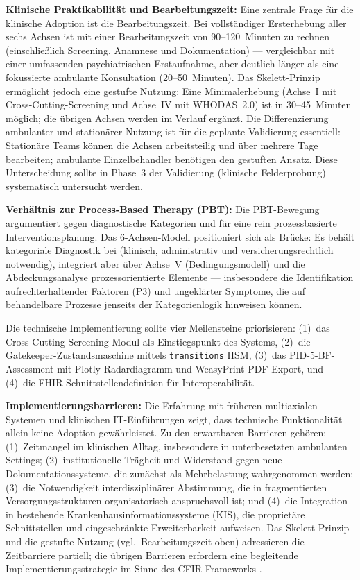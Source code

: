\documentclass[11pt,a4paper]{article}
\begin{document}
\textbf{Klinische Praktikabilit\"at und Bearbeitungszeit:} Eine zentrale Frage f\"ur die klinische Adoption ist die Bearbeitungszeit. Bei vollst\"andiger Ersterhebung aller sechs Achsen ist mit einer Bearbeitungszeit von 90--120~Minuten zu rechnen (einschlie\ss{}lich Screening, Anamnese und Dokumentation) --- vergleichbar mit einer umfassenden psychiatrischen Erstaufnahme, aber deutlich l\"anger als eine fokussierte ambulante Konsultation (20--50~Minuten). Das Skelett-Prinzip erm\"oglicht jedoch eine gestufte Nutzung: Eine Minimalerhebung (Achse~I mit Cross-Cutting-Screening und Achse~IV mit WHODAS~2.0) ist in 30--45~Minuten m\"oglich; die \"ubrigen Achsen werden im Verlauf erg\"anzt. Die Differenzierung ambulanter und station\"arer Nutzung ist f\"ur die geplante Validierung essentiell: Station\"are Teams k\"onnen die Achsen arbeitsteilig und \"uber mehrere Tage bearbeiten; ambulante Einzelbehandler ben\"otigen den gestuften Ansatz. Diese Unterscheidung sollte in Phase~3 der Validierung (klinische Felderprobung) systematisch untersucht werden.

\textbf{Verh\"altnis zur Process-Based Therapy (PBT):} Die PBT-Bewegung argumentiert gegen diagnostische Kategorien und f\"ur eine rein prozessbasierte Interventionsplanung. Das 6-Achsen-Modell positioniert sich als Br\"ucke: Es beh\"alt kategoriale Diagnostik bei (klinisch, administrativ und versicherungsrechtlich notwendig), integriert aber \"uber Achse~V (Bedingungsmodell) und die Abdeckungsanalyse prozessorientierte Elemente --- insbesondere die Identifikation aufrechterhaltender Faktoren (P3) und ungekl\"arter Symptome, die auf behandelbare Prozesse jenseits der Kategorienlogik hinweisen k\"onnen.

Die technische Implementierung sollte vier Meilensteine priorisieren: (1)~das Cross-Cutting-Screening-Modul als Einstiegspunkt des Systems, (2)~die Gatekeeper-Zustandsmaschine mittels \texttt{transitions} HSM, (3)~das PID-5-BF-Assessment mit Plotly-Radardiagramm und WeasyPrint-PDF-Export, und (4)~die FHIR-Schnittstellendefinition f\"ur Interoperabilit\"at.

\textbf{Implementierungsbarrieren:} Die Erfahrung mit fr\"uheren multiaxialen Systemen und klinischen IT-Einf\"uhrungen zeigt, dass technische Funktionalit\"at allein keine Adoption gew\"ahrleistet. Zu den erwartbaren Barrieren geh\"oren: (1)~Zeitmangel im klinischen Alltag, insbesondere in unterbesetzten ambulanten Settings; (2)~institutionelle Tr\"agheit und Widerstand gegen neue Dokumentationssysteme, die zun\"achst als Mehrbelastung wahrgenommen werden; (3)~die Notwendigkeit interdisziplin\"arer Abstimmung, die in fragmentierten Versorgungsstrukturen organisatorisch anspruchsvoll ist; und (4)~die Integration in bestehende Krankenhausinformationssysteme (KIS), die propriet\"are Schnittstellen und eingeschr\"ankte Erweiterbarkeit aufweisen. Das Skelett-Prinzip und die gestufte Nutzung (vgl.\ Bearbeitungszeit oben) adressieren die Zeitbarriere partiell; die \"ubrigen Barrieren erfordern eine begleitende Implementierungsstrategie im Sinne des CFIR-Frameworks \citep{Damschroder2009}.
\end{document}
